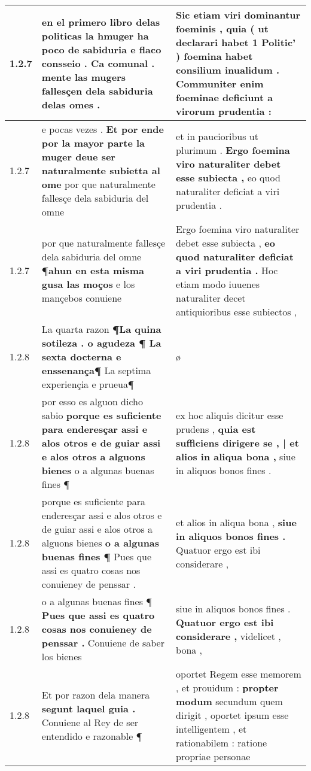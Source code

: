 \begin{tabular}{|p{1cm}|p{6.5cm}|p{6.5cm}|}
1.2.7 & en el primero libro delas politicas \textbf{ la hmuger ha poco de sabiduria e flaco consseio . Ca comunal . } mente las mugers fallesçen dela sabiduria delas omes . & Sic etiam viri dominantur foeminis , \textbf{ quia ( ut declarari habet 1 Politic’ ) foemina habet consilium inualidum . } Communiter enim foeminae deficiunt a virorum prudentia : \\\hline
1.2.7 & e pocas vezes . \textbf{ Et por ende por la mayor parte la muger deue ser naturalmente subietta al ome } por que naturalmente fallesçe dela sabiduria del omne & et in paucioribus ut plurimum . \textbf{ Ergo foemina viro naturaliter debet esse subiecta , } eo quod naturaliter deficiat a viri prudentia . \\\hline
1.2.7 & por que naturalmente fallesçe dela sabiduria del omne \textbf{ ¶ahun en esta misma gusa las moços } e los mançebos conuiene & Ergo foemina viro naturaliter debet esse subiecta , \textbf{ eo quod naturaliter deficiat a viri prudentia . } Hoc etiam modo iuuenes naturaliter decet antiquioribus esse subiectos , \\\hline
1.2.8 & La quarta razon \textbf{ ¶La quina sotileza . o agudeza ¶ La sexta docterna e enssenança¶ } La septima experiençia e prueua¶ & ø \\\hline
1.2.8 & por esso es alguon dicho sabio \textbf{ porque es suficiente para enderesçar assi e alos otros e de guiar assi e alos otros a alguons bienes } o a algunas buenas fines ¶ & ex hoc aliquis dicitur esse prudens , \textbf{ quia est sufficiens dirigere se , | et alios in aliqua bona , } siue in aliquos bonos fines . \\\hline
1.2.8 & porque es suficiente para enderesçar assi e alos otros e de guiar assi e alos otros a alguons bienes \textbf{ o a algunas buenas fines ¶ } Pues que assi es quatro cosas nos conuieney de penssar . & et alios in aliqua bona , \textbf{ siue in aliquos bonos fines . } Quatuor ergo est ibi considerare , \\\hline
1.2.8 & o a algunas buenas fines ¶ \textbf{ Pues que assi es quatro cosas nos conuieney de penssar . } Conuiene de saber los bienes & siue in aliquos bonos fines . \textbf{ Quatuor ergo est ibi considerare , } videlicet , bona , \\\hline
1.2.8 & Et por razon dela manera \textbf{ segunt laquel guia . } Conuiene al Rey de ser entendido e razonable ¶ & oportet Regem esse memorem , et prouidum : \textbf{ propter modum } secundum quem dirigit , oportet ipsum esse intelligentem , et rationabilem : ratione propriae personae \\\hline

\end{tabular}
